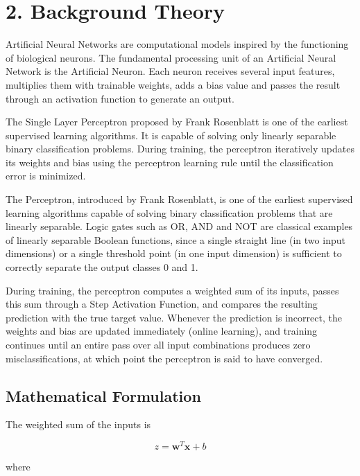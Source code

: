 \documentclass[11pt,a4paper]{article}
\begin{document}
\section*{2. Background Theory}

Artificial Neural Networks are computational models inspired by the functioning of biological neurons. The fundamental processing unit of an Artificial Neural Network is the Artificial Neuron. Each neuron receives several input features, multiplies them with trainable weights, adds a bias value and passes the result through an activation function to generate an output.

The Single Layer Perceptron proposed by Frank Rosenblatt is one of the earliest supervised learning algorithms. It is capable of solving only linearly separable binary classification problems. During training, the perceptron iteratively updates its weights and bias using the perceptron learning rule until the classification error is minimized.





The Perceptron, introduced by Frank Rosenblatt, is one of the earliest supervised learning algorithms capable of solving binary classification problems that are linearly separable. Logic gates such as OR, AND and NOT are classical examples of linearly separable Boolean functions, since a single straight line (in two input dimensions) or a single threshold point (in one input dimension) is sufficient to correctly separate the output classes 0 and 1.

During training, the perceptron computes a weighted sum of its inputs, passes this sum through a Step Activation Function, and compares the resulting prediction with the true target value. Whenever the prediction is incorrect, the weights and bias are updated immediately (online learning), and training continues until an entire pass over all input combinations produces zero misclassifications, at which point the perceptron is said to have converged.
\newpage

\subsection*{Mathematical Formulation}

The weighted sum of the inputs is

\[
z=\mathbf{w}^{T}\mathbf{x}+b
\]

where
\end{document}
